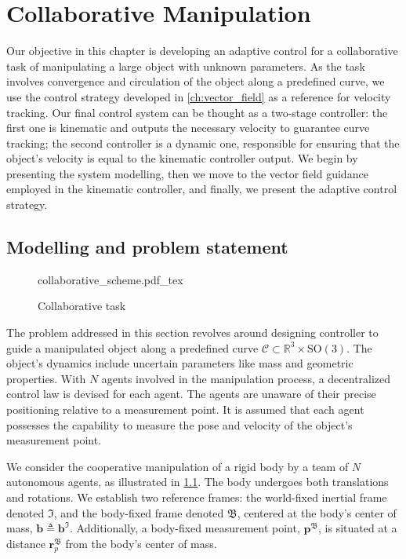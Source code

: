 \chapter{Collaborative Manipulation}\label{ch:collaborative}
Our objective in this chapter is developing an adaptive control for a collaborative task of manipulating a large object with unknown parameters. As the task involves convergence and circulation of the object along a predefined curve, we use the control strategy developed in \cref{ch:vector_field} as a reference for velocity tracking. Our final control system can be thought as a two-stage controller: the first one is kinematic and outputs the necessary velocity to guarantee curve tracking; the second controller is a dynamic one, responsible for ensuring that the object's velocity is equal to the kinematic controller output. We begin by presenting the system modelling, then we move to the vector field guidance employed in the kinematic controller, and finally, we present the adaptive control strategy.
\section{Modelling and problem statement} \label{sec:dynamic-modelling}
\begin{figure}[ht]
    \centering
    \def\svgwidth{.8\linewidth}
    {collaborative_scheme.pdf_tex}
    \caption{Collaborative task}
    \label{fig:problem}
\end{figure}
The problem addressed in this section revolves around designing controller to guide a manipulated object along a predefined curve $\mathcal{C} \subset \mathbb{R}^3\times \text{SO}(3)$. The object's dynamics include uncertain parameters like mass and geometric properties. With $N$ agents involved in the manipulation process, a decentralized control law is devised for each agent. The agents are unaware of their precise positioning relative to a measurement point. It is assumed that each agent possesses the capability to measure the pose and velocity of the object's measurement point.

We consider the cooperative manipulation of a rigid body by a team of $N$ autonomous agents, as illustrated in \cref{fig:problem}. The body undergoes both translations and rotations. We establish two reference frames: the world-fixed inertial frame denoted $\mathfrak{I}$, and the body-fixed frame denoted $\mathfrak{B}$, centered at the body's center of mass, $\mathbf{b}\triangleq\mathbf{b}^\mathfrak{I}$. Additionally, a body-fixed measurement point, $\mathbf{p}^\mathfrak{B}$, is situated at a distance $\mathbf{r}_p^\mathfrak{B}$ from the body's center of mass.

